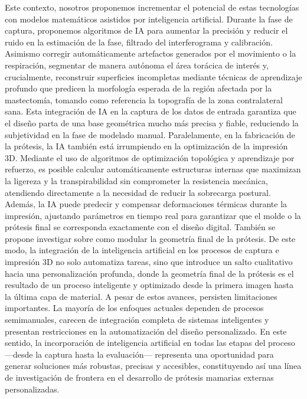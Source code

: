 \documentclass[12pt,a4paper]{article}
\begin{document}
 Este contexto, nosotros proponemos incrementar el potencial de estas tecnologías con modelos matemáticos asistidos por inteligencia artificial. Durante la fase de captura, proponemos algoritmos 
 de IA para aumentar la precisión y reducir el ruido en la estimación de la fase, filtrado del 
 interferograma y calibración. Asimismo corregir automáticamente artefactos generados por el 
 movimiento o la respiración, segmentar de manera autónoma el área torácica de interés y, crucialmente, 
 reconstruir superficies incompletas mediante técnicas de aprendizaje profundo que predicen la morfología 
 esperada de la región afectada por la mastectomía, tomando como referencia la topografía de la zona 
 contralateral sana. Esta integración de IA en la captura de los datos de entrada garantiza 
 que el diseño parta de una base geométrica mucho más precisa y fiable, reduciendo la subjetividad en 
 la fase de modelado manual. Paralelamente, en la fabricación de la prótesis, la IA también está 
 irrumpiendo en la optimización de la impresión 3D. Mediante el uso de algoritmos de optimización 
 topológica y aprendizaje por refuerzo, es posible calcular automáticamente estructuras internas
 que maximizan la ligereza y la transpirabilidad sin comprometer la resistencia mecánica, atendiendo 
 directamente a la necesidad de reducir la sobrecarga postural. Además, la IA puede predecir y 
 compensar deformaciones térmicas durante la impresión, ajustando parámetros en tiempo real para 
 garantizar que el molde o la prótesis final se corresponda exactamente con el diseño digital. También se propone investigar sobre como modular la geometría final de la prótesis. De este modo, la integración de la inteligencia artificial en los procesos de captura e impresión 3D no solo automatiza tareas, sino que introduce un salto cualitativo hacia una personalización profunda, donde la geometría final de la prótesis es el resultado de un proceso inteligente y optimizado desde la primera imagen hasta la última capa de material. A pesar de estos avances, persisten limitaciones importantes. La mayoría de los enfoques actuales dependen de procesos semimanuales, carecen de integración completa de sistemas inteligentes y presentan restricciones en la automatización del diseño personalizado. En este sentido, la incorporación de inteligencia artificial en todas las etapas del proceso —desde la captura hasta la evaluación— representa una oportunidad 
para generar soluciones más robustas, precisas y accesibles, constituyendo así una 
línea de investigación de frontera en el desarrollo de prótesis mamarias externas personalizadas.
\end{document}
